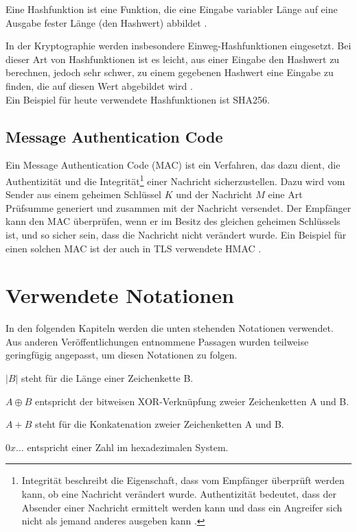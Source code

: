 Eine Hashfunktion ist eine Funktion, die eine Eingabe variabler Länge auf eine Ausgabe fester Länge (den Hashwert) abbildet \cite{Schneier2006}.

In der Kryptographie werden insbesondere Einweg-Hashfunktionen eingesetzt. Bei dieser Art von Hashfunktionen ist es leicht, aus einer Eingabe den Hashwert zu berechnen, jedoch sehr schwer, zu einem gegebenen Hashwert eine Eingabe zu finden, die auf diesen Wert abgebildet wird \cite{Schneier2006}. \\Ein Beispiel für heute verwendete Hashfunktionen ist SHA256.

\subsection{Message Authentication Code}

\label{sec_mac}

Ein Message Authentication Code (MAC) ist ein Verfahren, das dazu dient, die Authentizität und die Integrität\footnote{
	Integrität beschreibt die Eigenschaft, dass vom Empfänger überprüft werden kann, ob eine Nachricht verändert wurde. Authentizität bedeutet, dass der Absender einer Nachricht ermittelt werden kann und dass ein Angreifer sich nicht als jemand anderes ausgeben kann \cite{Schneier2006}.
} einer Nachricht sicherzustellen. Dazu wird vom Sender aus einem geheimen Schlüssel \(K\) und der Nachricht \(M\) eine Art Prüfsumme generiert und zusammen mit der Nachricht versendet. Der Empfänger kann den MAC überprüfen, wenn er im Besitz des gleichen geheimen Schlüssels ist, und so sicher sein, dass die Nachricht nicht verändert wurde. Ein Beispiel für einen solchen MAC ist der auch in TLS verwendete HMAC \cite{Schneier2006, ferguson10}.

\section{Verwendete Notationen}

In den folgenden Kapiteln werden die unten stehenden Notationen verwendet. Aus anderen Veröffentlichungen entnommene Passagen wurden teilweise geringfügig angepasst, um diesen Notationen zu folgen.

\(|B|\) steht für die Länge einer Zeichenkette B.

\(A \oplus B\) entspricht der bitweisen XOR-Verknüpfung zweier Zeichenketten A und B.

\(A + B\) steht für die Konkatenation zweier Zeichenketten A und B.

\(0x\dots\) entspricht einer Zahl im hexadezimalen System.

